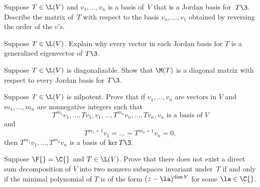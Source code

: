 \exercise
Suppose $T \in \L(V)$ and $v_1, \dots, v_n$ is a basis of~$V$ that is a Jordan
basis for~$T\3$. Describe the matrix of~$T$ with respect to the basis
$v_n, \dots, v_1$ obtained by reversing the order of the $v$'s.


\exercise
Suppose $T \in \L(V)$. Explain why every vector in each Jordan basis for $T$ is a generalized eigenvector of $T\3$.\label{8JorGenEig}


\exercise
Suppose $T \in \L(V)$ is diagonalizable. Show that $\M(T)$ is a diagonal matrix with respect to every Jordan basis for $T\3$.


\exercise
Suppose $T \in \L(V)$ is nilpotent. Prove that if $v_1, \dots, v_n$ are vectors in $V$ and $m_1, \dots, m_n$ are nonnegative integers such that
\[
T^{m_1}v_1, \dots, Tv_1, v_1, \dots, T^{m_n}v_n, \dots, Tv_n, v_n \text{ is a basis of } V
\]
and
\[
T^{m_1 + 1} v_1 = \dots = T^{m_n + 1} v_n = 0,
\]
then $T^{m_1}v_1, \dots, T^{m_n}v_n$ is a basis of $\ker T\3$.


\exercise
Suppose $\F{} = \C{}$ and $T \in \L(V)$.  Prove that there
does not exist a direct sum decomposition of $V$ into two nonzero subspaces
invariant under~$T$ if and only if the minimal polynomial of $T$ is of the form
$(z - \la)^{\dim V}$ for some $\la \in \C{}$.


